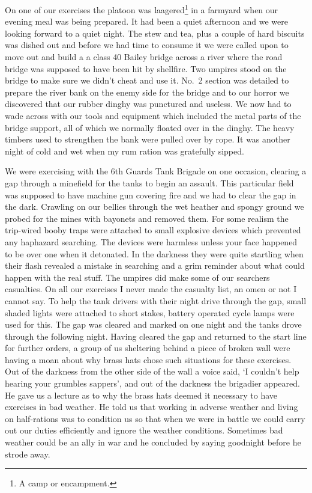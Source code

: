 On one of our exercises the platoon was laagered\footnote{A camp or
encampment.} in a farmyard when our evening meal was being
prepared. It had been a quiet afternoon and we were looking forward to
a quiet night. The stew and tea, plus a couple of hard biscuits was
dished out and before we had time to consume it we were called upon to
move out and build a a class 40 Bailey bridge across a river where the
road bridge was supposed to have been hit by shellfire. Two umpires
stood on the bridge to make sure we didn't cheat and use it. No.~2
section was detailed to prepare the river bank on the enemy side for
the bridge and to our horror we discovered that our rubber dinghy was
punctured and useless.  We now had to wade across with our tools and
equipment which included the metal parts of the bridge support, all of
which we normally floated over in the dinghy. The heavy timbers used
to strengthen the bank were pulled over by rope. It was another night
of cold and wet when my rum ration was gratefully sipped.

We were exercising with the 6th Guards Tank Brigade on one occasion,
clearing a gap through a minefield for the tanks to begin an assault.
This particular field was supposed to have machine gun covering fire
and we had to clear the gap in the dark. Crawling on our bellies
through the wet heather and spongy ground we probed for the mines with
bayonets and removed them. For some realism the trip-wired booby
traps were attached to small explosive devices which prevented any
haphazard searching. The devices were harmless unless your face
happened to be over one when it detonated. In the darkness they were
quite startling when their flash revealed a mistake in searching and a
grim reminder about what could happen with the real stuff. The
umpires did make some of our searchers casualties. On all our
exercises I never made the casualty list, an omen or not I cannot say.
To help the tank drivers with their night drive through the gap, small
shaded lights were attached to short stakes, battery operated cycle
lamps were used for this. The gap was cleared and marked on one night
and the tanks drove through the following night. Having cleared the
gap and returned to the start line for further orders, a group of us
sheltering behind a piece of broken wall were having a moan about why
brass hats chose such situations for these exercises. Out of the
darkness from the other side of the wall a voice said, `I couldn't
help hearing your grumbles sappers', and out of the darkness the
brigadier appeared. He gave us a lecture as to why the brass hats
deemed it necessary to have exercises in bad weather. He told us
that working in adverse weather and living on half-rations was to
condition us so that when we were in battle we could carry out our
duties efficiently and ignore the weather conditions. Sometimes bad
weather could be an ally in war and he concluded by saying goodnight
before he strode away.


